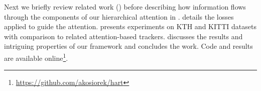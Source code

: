     \iffalse
    \begin{itemize}
        \item a biologically plausible way of combining attention mechanisms with recurrent neural networks for object tracking,
        \item a hierarchy of attention mechanisms that leads to suppressing distractors and computational efficiency,
        \item the scaling of an attention-based tracker to real-world exceeding prior recurrent attentive tracking models. 
    \end{itemize}
    \fi
    
    Next we briefly review related work () before describing how information flows through the components of our hierarchical attention in .  details the losses applied to guide the attention.  presents experiments on KTH and KITTI datasets with comparison to related attention-based trackers.  discusses the results and intriguing properties of our framework and  concludes the work. Code and results are available online\footnote{\url{https://github.com/akosiorek/hart}}.
        

	
	
	
	
	
	
	
	
	

	